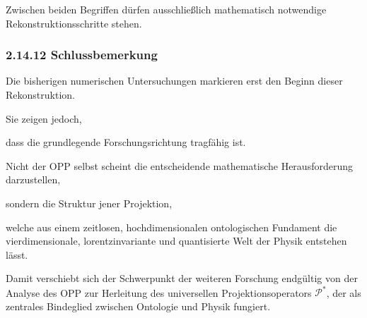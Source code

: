 Zwischen beiden Begriffen dürfen ausschließlich mathematisch notwendige
Rekonstruktionsschritte stehen.


\subsubsection*{2.14.12 Schlussbemerkung}

Die bisherigen numerischen Untersuchungen markieren erst den Beginn dieser
Rekonstruktion.

Sie zeigen jedoch,

dass die grundlegende Forschungsrichtung tragfähig ist.

Nicht der OPP selbst scheint die entscheidende mathematische Herausforderung
darzustellen,

sondern die Struktur jener Projektion,

welche aus einem zeitlosen, hochdimensionalen ontologischen Fundament die
vierdimensionale, lorentzinvariante und quantisierte Welt der Physik entstehen
lässt.

Damit verschiebt sich der Schwerpunkt der weiteren Forschung endgültig von der
Analyse des OPP zur Herleitung des universellen Projektionsoperators
\(\mathcal P^\ast\), der als zentrales Bindeglied zwischen Ontologie und Physik
fungiert.

